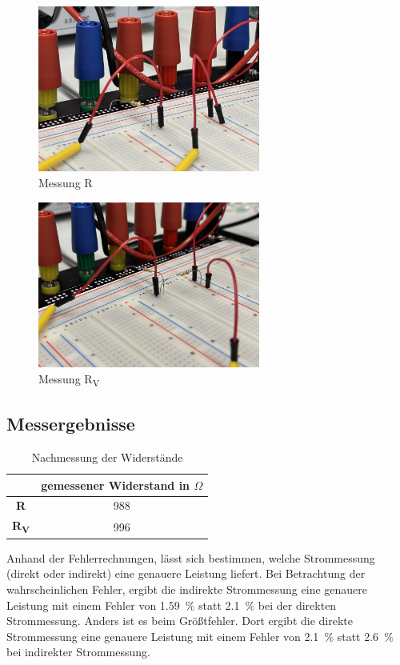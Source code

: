 \documentclass[a4paper,12pt]{article}
\begin{document}
\begin{figure}[H]
    \centering
    \includegraphics[width=0.65\textwidth]{../Quellen/Labor2/Fotos/IMG_3979.jpeg}
\caption{Messung R}
\end{figure}

\begin{figure}[H]
    \centering
    \includegraphics[width=0.65\textwidth]{../Quellen/Labor2/Fotos/IMG_3980.jpeg}
\caption{Messung R\textsubscript{V}}
\end{figure}


\subsection{Messergebnisse}
\begin{table}[H]
	\centering
	\begin{tabular}{|c|c|}
		\hline
		  & gemessener Widerstand in $\Omega$\\
		\hline		
		\textbf{R} & 988\\
		\hline
		\textbf{R\textsubscript{V}} & 996\\
		\hline
	\end{tabular}
	\caption{Nachmessung der Widerstände}
\end{table}
Anhand der Fehlerrechnungen, lässt sich bestimmen, welche Strommessung (direkt oder indirekt) eine genauere Leistung liefert. Bei Betrachtung der wahrscheinlichen Fehler, ergibt die indirekte Strommessung eine genauere Leistung mit einem Fehler von 1.59~$\%$ statt 2.1~$\%$ bei der direkten Strommessung. Anders ist es beim Größtfehler. Dort ergibt die direkte Strommessung eine genauere Leistung mit einem Fehler von 2.1~$\%$ statt 2.6~$\%$ bei indirekter Strommessung.
\end{document}
